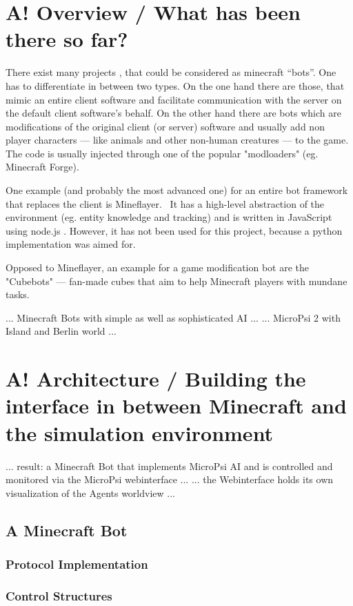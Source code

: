 \section{A! Overview / What has been there so far?}
There exist many projects , that could be considered as minecraft ``bots''. One has to differentiate in between two types. On the one hand there are those, that mimic an entire client software and facilitate communication with the server on the default client software's behalf. On the other hand there are bots which are modifications of the original client (or server) software and usually add non player characters --- like animals and other non-human creatures --- to the game. The code is usually injected through one of the popular "modloaders" (eg. Minecraft Forge).

One example (and probably the most advanced one) for an entire bot framework that replaces the client is Mineflayer.~\cite{github_mineflayer} It has a high-level abstraction of the environment (eg. entity knowledge and tracking) and is written in JavaScript using node.js . However, it has not been used for this project, because a python implementation was aimed for.

Opposed to Mineflayer, an example for a game modification bot are the "Cubebots" --- fan-made cubes that aim to help Minecraft players with mundane tasks.\cite{mcforums_cubebots}


... Minecraft Bots with simple as well as sophisticated AI ...
... MicroPsi 2 with Island and Berlin world ...

\section{A! Architecture / Building the interface in between Minecraft and the simulation environment}
... result: a Minecraft Bot that implements MicroPsi AI and is controlled and monitored via the MicroPsi webinterface ...
... the Webinterface holds its own visualization of the Agents worldview ...

\subsection{A Minecraft Bot}

\subsubsection{Protocol Implementation}

\subsubsection{Control Structures}

